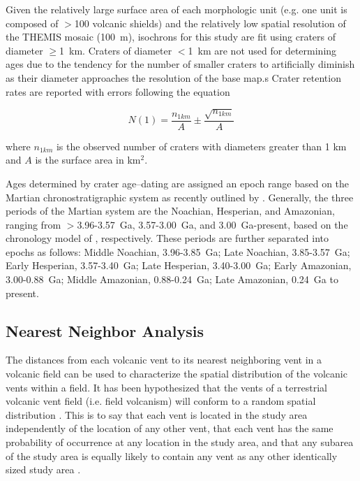 Given the relatively large surface area of each morphologic unit (e.g. one unit is composed of $>$100 volcanic shields) and the relatively low spatial resolution of the THEMIS mosaic (100~m), isochrons for this study are fit using craters of diameter $\ge$1~km. Craters of diameter $<$1~km are not used for determining ages due to the tendency for the number of smaller craters to artificially diminish as their diameter approaches the resolution of the base map.s Crater retention rates are reported with errors following the equation
\begin{linenomath*}\begin{equation}
N(1) = \frac{n_{1km}}{A} \pm \frac{\sqrt{n_{1km}}}{A} \label{eq1}
\end{equation}\end{linenomath*} where $n_{1km}$ is the observed number of craters with diameters greater than 1 km and $A$ is the surface area in km$^2$.

Ages determined by crater age--dating are assigned an epoch range based on the Martian chronostratigraphic system as recently outlined by \citet{Werner2011}. Generally, the three periods of the Martian system are the Noachian, Hesperian, and Amazonian, ranging from $>$3.96-3.57~Ga, 3.57-3.00~Ga, and 3.00~Ga-present, based on the chronology model of \citet{Hartmann2005}, respectively. These periods are further separated into epochs as follows: Middle Noachian, 3.96-3.85~Ga; Late Noachian, 3.85-3.57~Ga; Early Hesperian, 3.57-3.40~Ga; Late Hesperian, 3.40-3.00~Ga; Early Amazonian, 3.00-0.88~Ga; Middle Amazonian, 0.88-0.24~Ga; Late Amazonian, 0.24~Ga to present.

\subsection{Nearest Neighbor Analysis}
\label{sec:methodNN}

The distances from each volcanic vent to its nearest neighboring vent in a volcanic field can be used to characterize the spatial distribution of the volcanic vents within a field. It has been hypothesized that the vents of a terrestrial volcanic vent field (i.e. field volcanism) will conform to a random spatial distribution \citep{Lutz1986,Lutz1995}. This is to say that each vent is located in the study area independently of the location of any other vent, that each vent has the same probability of occurrence at any location in the study area, and that any subarea of the study area is equally likely to contain any vent as any other identically sized study area \citep{Clark1954}.

